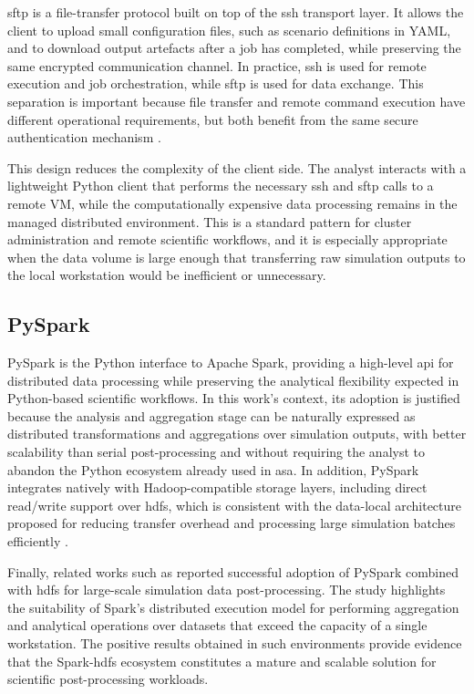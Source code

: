 \gls{sftp} is a file-transfer protocol built on top of the \gls{ssh} transport layer. It allows the client to upload small configuration files, such as scenario definitions in YAML, and to download output artefacts after a job has completed, while preserving the same encrypted communication channel. In practice, \gls{ssh} is used for remote execution and job orchestration, while \gls{sftp} is used for data exchange. This separation is important because file transfer and remote command execution have different operational requirements, but both benefit from the same secure authentication mechanism \parencite{openssh2024, sftpmanual2024}.

This design reduces the complexity of the client side. The analyst interacts with a lightweight Python client that performs the necessary \gls{ssh} and \gls{sftp} calls to a remote VM, while the computationally expensive data processing remains in the managed distributed environment. This is a standard pattern for cluster administration and remote scientific workflows, and it is especially appropriate when the data volume is large enough that transferring raw simulation outputs to the local workstation would be inefficient or unnecessary.

\subsection{PySpark}
\label{subsec:cap2-pyspark}

PySpark is the Python interface to Apache Spark, providing a high-level \gls{api} for distributed data processing while preserving the analytical flexibility expected in Python-based scientific workflows. In this work's context, its adoption is justified because the analysis and aggregation stage can be naturally expressed as distributed transformations and aggregations over simulation outputs, with better scalability than serial post-processing and without requiring the analyst to abandon the Python ecosystem already used in \gls{asa}. In addition, PySpark integrates natively with Hadoop-compatible storage layers, including direct read/write support over \gls{hdfs}, which is consistent with the data-local architecture proposed for reducing transfer overhead and processing large simulation batches efficiently \parencite{zaharia2012rdd,sparkpysparkdocs}.

Finally, related works such as \textcite{li2018postprocessing} reported successful adoption of PySpark combined with \gls{hdfs} for large-scale simulation data post-processing. The study highlights the suitability of Spark's distributed execution model for performing aggregation and analytical operations over datasets that exceed the capacity of a single workstation. The positive results obtained in such environments provide evidence that the Spark-\gls{hdfs} ecosystem constitutes a mature and scalable solution for scientific post-processing workloads.

